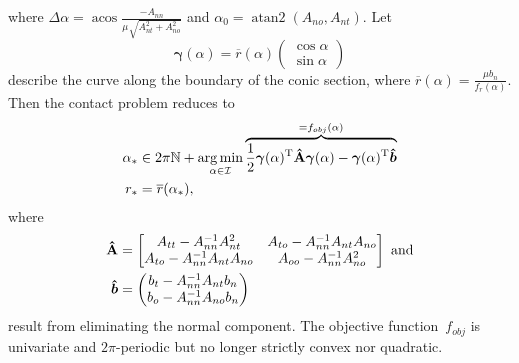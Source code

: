 \documentclass[global,twocolumn]{svjour}
\let\vec\bm
\newcommand{\argmin}{\operatornamewithlimits{arg\,min}}
\newcommand{\mat}[1]{{\bf #1}}
\newcommand{\dvect}[2]{\ensuremath{\begin{pmatrix}#1\\#2\end{pmatrix}}}
\newcommand{\transp}{{\mathrm{T}}}
\newcommand{\cof}[1]{\ensuremath{\mu_{#1}}}
\newcommand{\atan}[1]{\operatorname{atan#1}}
\newcommand{\acos}{\operatorname{acos}}
\begin{document}
			where $\Delta \alpha = \acos \frac{-A_{nn}}{\cof{}\sqrt{A_{nt}^2 + A_{no}^2}}$ and $\alpha_0 = \atan2(A_{no}, A_{nt})$. Let
			\begin{equation*}
				\vec \gamma(\alpha) = \overline{r}(\alpha)\dvect{\cos\alpha}{\sin\alpha}
			\end{equation*}
			describe the curve along the boundary of the conic section, where $\overline{r}(\alpha) = \frac{\mu b_n}{f_r(\alpha)}$.
			Then the contact problem reduces to
			\begin{equation*}
				\begin{split}
					\alpha_* & \in 2\pi \mathbb{N} + \argmin_{\alpha \in \mathcal{I}} \overbrace{\frac{1}{2} \vec \gamma(\alpha)^\transp \mat{\hat{A}} \vec \gamma(\alpha) - \vec \gamma(\alpha)^\transp \vec{\hat{b}}}^{=f_{obj}(\alpha)} \\
					r_*      & = \overline{r}(\alpha_*),
				\end{split}
			\end{equation*}
			where
			\begin{equation*}
				\begin{split}
					\mat{\hat{A}} & = \begin{bmatrix} A_{tt} - A_{nn}^{-1} A_{nt}^2 & A_{to} - A_{nn}^{-1} A_{nt} A_{no} \\ A_{to} - A_{nn}^{-1} A_{nt} A_{no} & A_{oo} - A_{nn}^{-1} A_{no}^2 \end{bmatrix}\ \text{and} \\
					\vec{\hat{b}} & = \dvect{b_t - A_{nn}^{-1} A_{nt} b_n}{b_o - A_{nn}^{-1} A_{no} b_n}
				\end{split}
			\end{equation*}
			result from eliminating the normal component. The objective
			function~$f_{obj}$ is univariate and $2\pi$-periodic but no longer
			strictly convex nor quadratic.
\end{document}
